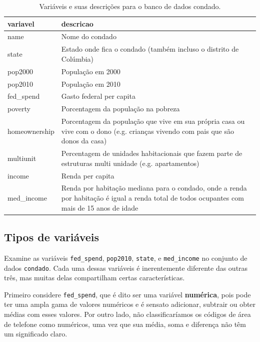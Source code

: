 \documentclass[
]{book}
\theoremstyle{definition}
\theoremstyle{definition}
\theoremstyle{definition}
\theoremstyle{definition}
\theoremstyle{remark}
\begin{document}
\begin{table}

\caption{\label{tab:countyVariables}Variáveis e suas descrições para o banco de dados condado.}
\centering
\begin{tabular}[t]{>{\raggedleft\arraybackslash}p{15em}|>{\raggedleft\arraybackslash}p{15em}}
\hline
variavel & descricao\\
\hline
name & Nome do condado\\
\hline
state & Estado onde fica o condado (também incluso o distrito de Colúmbia)\\
\hline
pop2000 & População em 2000\\
\hline
pop2010 & População em 2010\\
\hline
fed\_spend & Gasto federal per capita\\
\hline
poverty & Porcentagem da população na pobreza\\
\hline
homeownership & Porcentagem da população que vive em sua própria casa ou vive com o dono (e.g. crianças vivendo com pais que são donos da casa)\\
\hline
multiunit & Percentagem de unidades habitacionais que fazem parte de estruturas multi unidade (e.g. apartamentos)\\
\hline
income & Renda per capita\\
\hline
med\_income & Renda por habitação mediana para o condado, onde a renda por habitação é igual a renda total de todos ocupantes com mais de 15 anos de idade\\
\hline
\end{tabular}
\end{table}

\hypertarget{typesVariables}{%
\subsection{Tipos de variáveis}\label{typesVariables}}

Examine as variáveis \texttt{fed\_spend}, \texttt{pop2010}, \texttt{state}, e \texttt{med\_income} no conjunto de dados \texttt{condado}. Cada uma dessas variáveis é inerentemente diferente das outras três, mas muitas delas compartilham certas características.

Primeiro considere \texttt{fed\_spend}, que é dito ser uma variável \textbf{numérica}, pois pode ter uma ampla gama de valores numéricos e é sensato adicionar, subtrair ou obter médias com esses valores. Por outro lado, não classificaríamos os códigos de área de telefone como numéricos, uma vez que sua média, soma e diferença não têm um significado claro.
\end{document}

